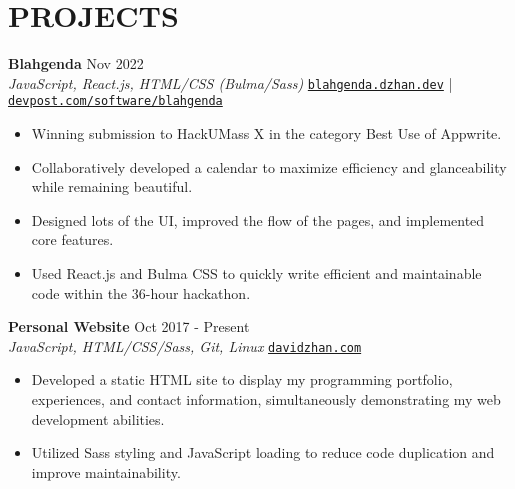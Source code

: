 \documentclass[letterpaper,10pt]{extarticle}
\begin{document}

\section*{PROJECTS}
\noindent
\textbf{Blahgenda} \hfill Nov 2022\\ %
\textit{JavaScript, React.js, HTML/CSS (Bulma/Sass)} \hfill \texttt{\href{https://blahgenda.dzhan.dev}{blahgenda.dzhan.dev}} | \texttt{\href{https://devpost.com/software/blahgenda}{devpost.com/software/blahgenda}}
\begin{itemize}
    \item Winning submission to HackUMass X in the category Best Use of Appwrite.
    \item Collaboratively developed a calendar to maximize efficiency and glanceability while remaining beautiful.
    \item Designed lots of the UI, improved the flow of the pages, and implemented core features.
    \item Used React.js and Bulma CSS to quickly write efficient and maintainable code within the 36-hour hackathon.
\end{itemize}

\noindent
\textbf{Personal Website} \hfill Oct 2017 - Present\\ %
\textit{JavaScript, HTML/CSS/Sass, Git, Linux} \hfill \texttt{\href{https://davidzhan.com}{davidzhan.com}} %
\begin{itemize}
    \item Developed a static HTML site to display my programming portfolio, experiences, and contact information, simultaneously demonstrating my web development abilities.
    \item Utilized Sass styling and JavaScript loading to reduce code duplication and improve maintainability. %
\end{itemize}
\end{document}
